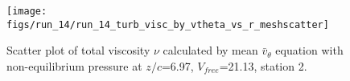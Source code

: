 \begin{figure}[H]
\centering
\texttt{[image: figs/run\_14/run\_14\_turb\_visc\_by\_vtheta\_vs\_r\_meshscatter]}
\caption{Scatter plot of total viscosity $\nu$ calculated by mean $\bar{v}_{\theta}$ equation with non-equilibrium pressure at $z/c$=6.97, $V_{free}$=21.13, station 2.}
\label{fig:run_14_turb_visc_by_vtheta_vs_r_meshscatter}
\end{figure}


